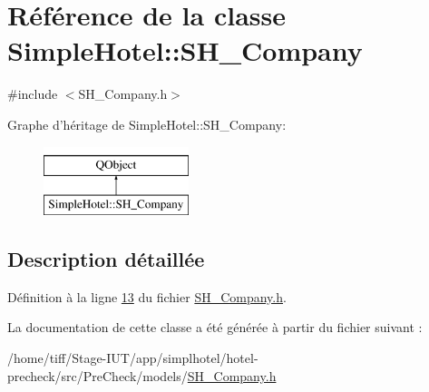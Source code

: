 \hypertarget{classSimpleHotel_1_1SH__Company}{\section{Référence de la classe Simple\-Hotel\-:\-:S\-H\-\_\-\-Company}
\label{classSimpleHotel_1_1SH__Company}
}


{\ttfamily \#include $<$S\-H\-\_\-\-Company.\-h$>$}

Graphe d'héritage de Simple\-Hotel\-:\-:S\-H\-\_\-\-Company\-:\begin{figure}[H]
\begin{center}
\leavevmode
\includegraphics[height=2.000000cm]{classSimpleHotel_1_1SH__Company}
\end{center}
\end{figure}


\subsection{Description détaillée}


Définition à la ligne \hyperlink{SH__Company_8h_source_l00013}{13} du fichier \hyperlink{SH__Company_8h_source}{S\-H\-\_\-\-Company.\-h}.



La documentation de cette classe a été générée à partir du fichier suivant \-:\begin{DoxyCompactItemize}
\item 
/home/tiff/\-Stage-\/\-I\-U\-T/app/simplhotel/hotel-\/precheck/src/\-Pre\-Check/models/\hyperlink{SH__Company_8h}{S\-H\-\_\-\-Company.\-h}\end{DoxyCompactItemize}
